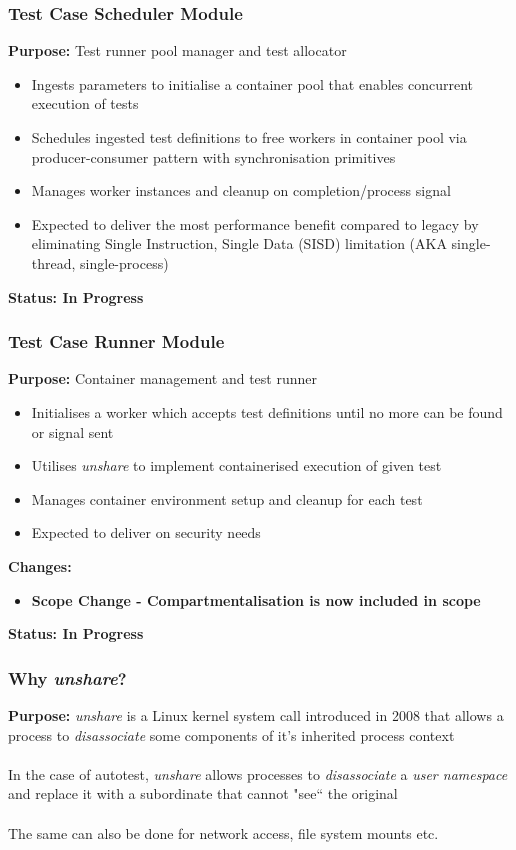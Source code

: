 \documentclass[xcolor]{beamer}
\begin{document}
\begin{frame}
	\frametitle{Test Case Scheduler Module}
	\textbf{Purpose:} Test runner pool manager and test allocator\\
	\begin{itemize}
		\item Ingests parameters to initialise a container pool that enables concurrent execution of tests
		\pause
		\item Schedules ingested test definitions to free workers in container pool via producer-consumer pattern with synchronisation primitives
		\pause
		\item Manages worker instances and cleanup on completion/process signal
		\pause
		\item Expected to deliver the most performance benefit compared to legacy by eliminating Single Instruction, Single Data (SISD) limitation (AKA single-thread, single-process)
		\pause
	\end{itemize}
	\textbf{Status: In Progress}
\end{frame}

\begin{frame}
	\frametitle{Test Case Runner Module}
	\textbf{Purpose:} Container management and test runner\\
	\begin{itemize}
		\item Initialises a worker which accepts test definitions until no more can be found or signal sent
		\pause
		\item Utilises \textit{unshare} to implement containerised execution of given test
		\pause
		\item Manages container environment setup and cleanup for each test
		\pause
		\item Expected to deliver on security needs
		\pause
	\end{itemize}
	\textbf{Changes:}
	\begin{itemize}
		\item \textbf{Scope Change - Compartmentalisation is now included in scope}
		\pause
	\end{itemize}
	\textbf{Status: In Progress}
\end{frame}

\begin{frame}
	\frametitle{Why \textit{unshare}?}
	\textbf{Purpose:} \textit{unshare} is a Linux kernel system call introduced in 2008 that allows a process to \textit{disassociate} some components of it's inherited process context
	\pause
	\\~\\
	In the case of autotest, \textit{unshare} allows processes to \textit{disassociate} a \textit{user namespace} and replace it with a subordinate that cannot "see`` the original
	\pause
	\\~\\
	The same can also be done for network access, file system mounts etc.
\end{frame}
\end{document}
